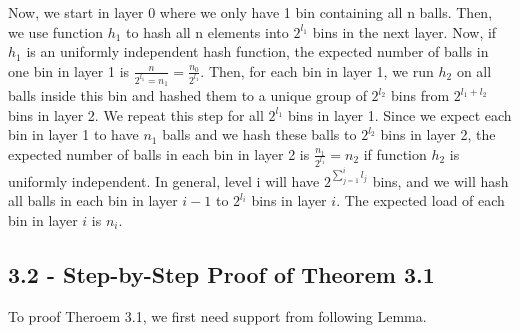 \documentclass[letterpaper]{article} %
\begin{document}
	Now, we start in layer 0 where we only have 1 bin containing all n balls. Then, we use function $h_1$ to hash all n elements into $2^{l_1}$ bins in the next layer. Now, if $h_1$ is an uniformly independent hash function, the expected number of balls in one bin in layer 1 is $\frac{n}{2^{l_1}=n_1}=\frac{n_0}{2^{l_1}}$. Then, for each bin in layer 1, we run $h_2$ on all balls inside this bin and hashed them to a unique group of $2^{l_2}$ bins from $2^{l_1+l_2}$ bins in layer 2. We repeat this step for all $2^{l_1}$ bins in layer 1. Since we expect each bin in layer 1 to have $n_1$ balls and we hash these balls to $2^{l_2}$ bins in layer 2, the expected number of balls in each bin in layer 2 is $\frac{n_1}{2^{l_1}}=n_2$ if function $h_2$ is uniformly independent. In general, level i will have $2^{\sum_{j=1}^{i}l_j}$ bins, and we will hash all balls in each bin in layer $i-1$ to $2^{l_i}$ bins in layer $i$. The expected load of each bin in layer $i$ is $n_i$.

 	\subsection{3.2 - Step-by-Step Proof of Theorem 3.1}
	To proof Theroem 3.1, we first need support from following Lemma.\\
	
\end{document}
